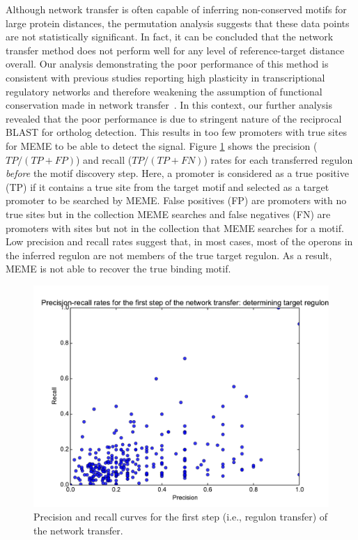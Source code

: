\documentclass[]{llncs}
\begin{document}
Although network transfer is often capable of inferring non-conserved motifs for
large protein distances, the permutation analysis suggests that these data
points are not statistically significant. In fact, it can be concluded that the
network transfer method does not perform well for any level of reference-target
distance overall. Our analysis demonstrating the poor performance of this method
is consistent with previous studies reporting high plasticity in transcriptional
regulatory networks and therefore weakening the assumption of functional
conservation made in network transfer~\cite{price2007orthologous,
  babu2006evolutionary, chavez2006bacterial}. In this context, our further
analysis revealed that the poor performance is due to stringent nature of the
reciprocal BLAST for ortholog detection. This results in too few promoters with
true sites for MEME to be able to detect the signal. Figure
\ref{fig:network_transfer} shows the precision ($TP/(TP+FP)$) and recall
($TP/(TP+FN)$) rates for each transferred regulon {\em before} the motif
discovery step. Here, a promoter is considered as a true positive (TP) if it
contains a true site from the target motif and selected as a target promoter to
be searched by MEME\@. False positives (FP) are promoters with no true sites but
in the collection MEME searches and false negatives (FN) are promoters with
sites but not in the collection that MEME searches for a motif. Low precision
and recall rates suggest that, in most cases, most of the operons in the
inferred regulon are not members of the true target regulon. As a result, MEME
is not able to recover the true binding motif.

\begin{figure}
  \centering
  \includegraphics[width=.6\textwidth]{figs/pr.pdf}
  \caption{Precision and recall curves for the first step (i.e., regulon
    transfer) of the network transfer. }
\label{fig:network_transfer}
\end{figure}
\end{document}
